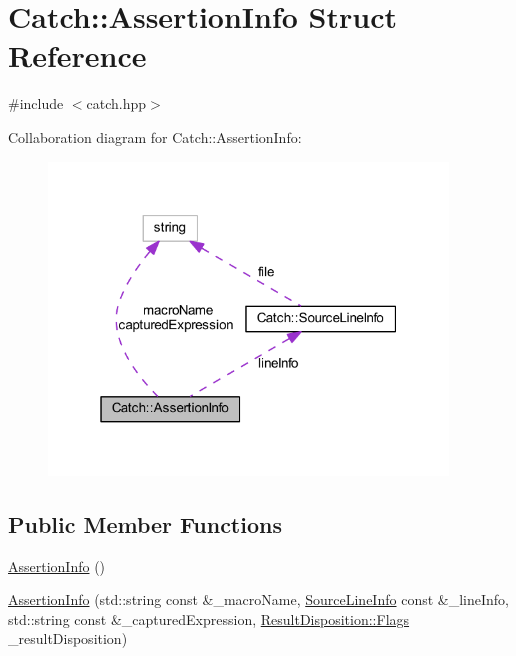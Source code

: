 \hypertarget{struct_catch_1_1_assertion_info}{}\section{Catch\+:\+:Assertion\+Info Struct Reference}
\label{struct_catch_1_1_assertion_info}


{\ttfamily \#include $<$catch.\+hpp$>$}



Collaboration diagram for Catch\+:\+:Assertion\+Info\+:\nopagebreak
\begin{figure}[H]
\begin{center}
\leavevmode
\includegraphics[width=301pt]{struct_catch_1_1_assertion_info__coll__graph}
\end{center}
\end{figure}
\subsection*{Public Member Functions}
\begin{DoxyCompactItemize}
\item 
\hyperlink{struct_catch_1_1_assertion_info_a15c29d306c86361f842a0351a6003b9f}{Assertion\+Info} ()
\item 
\hyperlink{struct_catch_1_1_assertion_info_aaf6cc3eebd40391e54d37ed42953c73f}{Assertion\+Info} (std\+::string const \&\+\_\+macro\+Name, \hyperlink{struct_catch_1_1_source_line_info}{Source\+Line\+Info} const \&\+\_\+line\+Info, std\+::string const \&\+\_\+captured\+Expression, \hyperlink{struct_catch_1_1_result_disposition_a3396cad6e2259af326b3aae93e23e9d8}{Result\+Disposition\+::\+Flags} \+\_\+result\+Disposition)
\end{DoxyCompactItemize}
